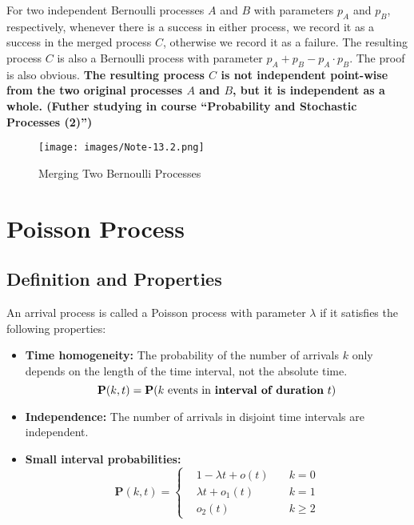 For two independent Bernoulli processes $A$ and $B$ with parameters $p_A$ and $p_B$, respectively, whenever there is a success in either process, we record it as a success in the merged process $C$, otherwise we record it as a failure. The resulting process $C$ is also a Bernoulli process with parameter $p_A + p_B - p_A \cdot p_B$.  The proof is also obvious. \textbf{The resulting process $C$ is not independent point-wise from the two original processes $A$ and $B$, but it is independent as a whole. (Futher studying in course ``Probability and Stochastic Processes (2)'')}
\begin{figure}[H]
    \centering
    \texttt{[image: images/Note-13.2.png]}
    \caption{Merging Two Bernoulli Processes}
\end{figure}


\section{Poisson Process}
\subsection{Definition and Properties}
\begin{definition}
    An arrival process is called a Poisson process with parameter $\lambda$ if it satisfies the following properties:
    \begin{itemize}
        \item \textbf{Time homogeneity:} The probability of the number of arrivals $k$ only depends on the length of the time interval, not the absolute time.
        \begin{equation}
            \mathbf{P}(k, t) = \mathbf{P}(k \text{ events in \textbf{interval of duration} } t)
        \end{equation}
        \item \textbf{Independence:} The number of arrivals in disjoint time intervals are independent.
        \item \textbf{Small interval probabilities:} 
        \begin{equation}
            \mathbf{P}(k, t) = \left\{\begin{aligned}
                & 1 - \lambda t + o(t) &\quad k = 0 \\
                & \lambda t + o_1(t) &\quad k = 1 \\
                & o_2(t) &\quad k \geq 2
            \end{aligned}\right.
        \end{equation}
    \end{itemize}
\end{definition}

